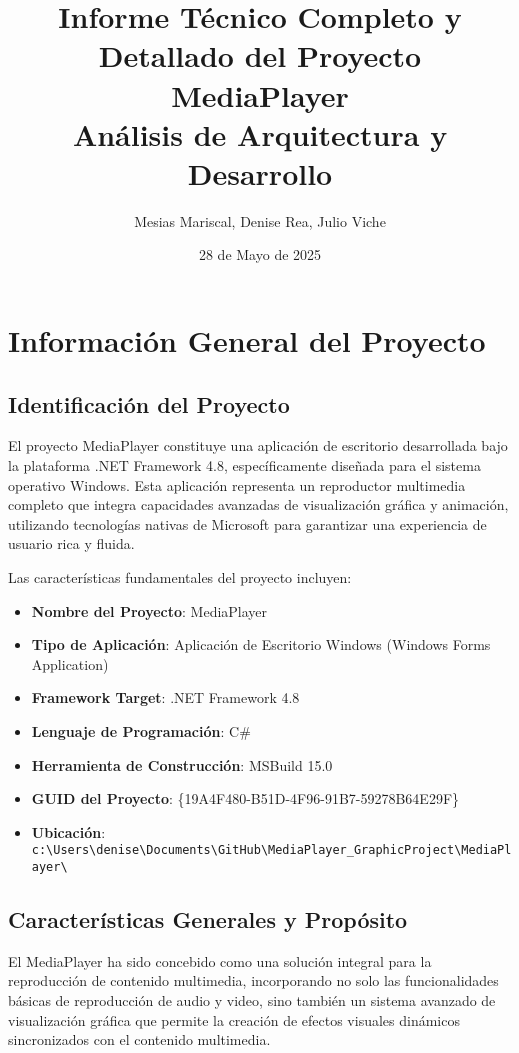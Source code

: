 \documentclass[a4paper]{article}
\title{Informe Técnico Completo y Detallado del Proyecto MediaPlayer \\
Análisis de Arquitectura y Desarrollo}
\author{Mesias Mariscal, Denise Rea, Julio Viche}
\date{28 de Mayo de 2025}
\begin{document}
\maketitle

\section{Información General del Proyecto}

\subsection{Identificación del Proyecto}

El proyecto MediaPlayer constituye una aplicación de escritorio desarrollada bajo la plataforma .NET Framework 4.8, específicamente diseñada para el sistema operativo Windows. Esta aplicación representa un reproductor multimedia completo que integra capacidades avanzadas de visualización gráfica y animación, utilizando tecnologías nativas de Microsoft para garantizar una experiencia de usuario rica y fluida.

Las características fundamentales del proyecto incluyen:

\begin{itemize}
\item \textbf{Nombre del Proyecto}: MediaPlayer
\item \textbf{Tipo de Aplicación}: Aplicación de Escritorio Windows (Windows Forms Application)
\item \textbf{Framework Target}: .NET Framework 4.8
\item \textbf{Lenguaje de Programación}: C\#
\item \textbf{Herramienta de Construcción}: MSBuild 15.0
\item \textbf{GUID del Proyecto}: \{19A4F480-B51D-4F96-91B7-59278B64E29F\}
\item \textbf{Ubicación}: \texttt{c:\textbackslash Users\textbackslash denise\textbackslash Documents\textbackslash GitHub\textbackslash MediaPlayer\_GraphicProject\textbackslash MediaPlayer\textbackslash}
\end{itemize}

\subsection{Características Generales y Propósito}

El MediaPlayer ha sido concebido como una solución integral para la reproducción de contenido multimedia, incorporando no solo las funcionalidades básicas de reproducción de audio y video, sino también un sistema avanzado de visualización gráfica que permite la creación de efectos visuales dinámicos sincronizados con el contenido multimedia.
\end{document}
